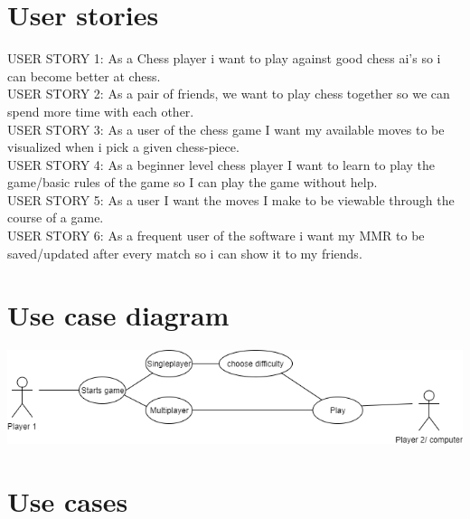 \documentclass{article}
\begin{document}
    \section{User stories}
        USER STORY 1: As a Chess player i want to play against good chess ai’s 
        so i can become better at chess. \\
        
        \noindent
        USER STORY 2: As a pair of friends, we want to play chess together so we
        can spend more time with each other. \\
        
        \noindent
        USER STORY 3: As a user of the chess game I want my available moves to 
        be visualized when i pick a given chess-piece. \\
        
        \noindent
        USER STORY 4: As a beginner level chess player I want to learn to play 
        the game/basic rules of the game so I can play the game without help. \\
        
        \noindent
        USER STORY 5: As a user I want the moves I make to be viewable through 
        the course of a game. \\
        
        \noindent
        USER STORY 6: As a frequent user of the software i want my MMR to be 
        saved/updated after every match so i can show it to my friends.

    \section{Use case diagram}
    \includegraphics[width=\linewidth]{image11.png}
    
    \section{Use cases}
\end{document}
